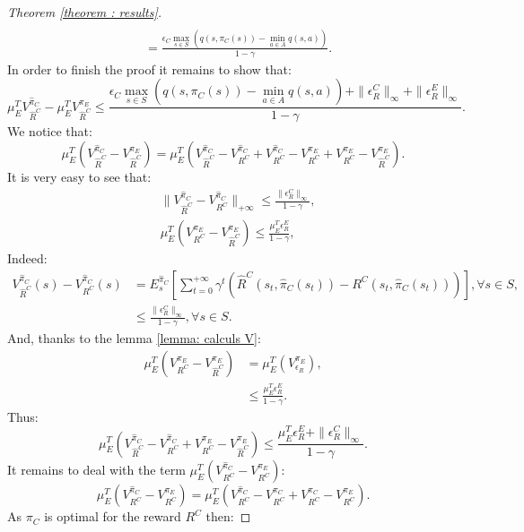 \documentclass{article} %
\newcommand{\0}{\mathbf{0}}
\newcommand{\1}{\mathbf{1}}
\begin{document}
\begin{proof}[Theorem \ref{theorem : results}]
\begin{align}
\\
&=\frac{\epsilon_C\max_{s\in S}(q(s,\pi_C(s))-\min_{a\in A}q(s,a))}{1-\gamma}.
\end{align}
In order to finish the proof it remains to show that:
\begin{equation}
\mu_E^TV^{\hat{\pi}_C}_{\hat{R}^C}-\mu_E^TV^{\pi_E}_{\hat{R}^C}\leq \frac{\epsilon_C\max_{s\in S}(q(s,\pi_C(s))-\min_{a\in A}q(s,a))+\|\epsilon^C_R\|_{\infty}+\|\epsilon^E_R\|_{\infty}}{1-\gamma}.
\end{equation}
We notice that:
\begin{equation}
\mu_E^T(V^{\hat{\pi}_C}_{\hat{R}^C}-V^{\pi_E}_{\hat{R}^C})=\mu_E^T(V^{\hat{\pi}_C}_{\hat{R}^C}-V^{\hat{\pi}_C}_{R^C}+V^{\hat{\pi}_C}_{R^C}-V^{\pi_E}_{R^C}+V^{\pi_E}_{R^C}-V^{\pi_E}_{\hat{R}^C}).
\end{equation}
It is very easy to see that:
\begin{align}
&\|V^{\hat{\pi}_C}_{\hat{R}^C}-V^{\hat{\pi}_C}_{R^C}\|_{+\infty}\leq\frac{\|\epsilon^C_R\|_{\infty}}{1-\gamma},
\\
&\mu_E^T(V^{\pi_E}_{R^C}-V^{\pi_E}_{\hat{R}^C})\leq\frac{\mu_E^T\epsilon^E_R}{1-\gamma},
\end{align}
Indeed:
\begin{align}
V^{\hat{\pi}_C}_{\hat{R}^C}(s)-V^{\hat{\pi}_C}_{R^C}(s)&=E^{\hat{\pi}_C}_s[\sum_{t=0}^{+\infty}\gamma^t(\hat{R}^C(s_t,\hat{\pi}_C(s_t))-R^C(s_t,\hat{\pi}_C(s_t)))], \forall s\in S,
\\
&\leq\frac{\|\epsilon^C_R\|_{\infty}}{1-\gamma}, \forall s\in S.
\end{align}
And, thanks to the lemma \ref{lemma: calculs V}:
\begin{align}
\mu_E^T(V^{\pi_E}_{R^C}-V^{\pi_E}_{\hat{R}^C})&=\mu_E^T(V^{\pi_E}_{\epsilon_R}),
\\
&\leq\frac{\mu_E^T\epsilon^E_R}{1-\gamma}.
\end{align}
Thus:
\begin{equation}
\label{equation: cas3-1}
\mu_E^T(V^{\hat{\pi}_C}_{\hat{R}^C}-V^{\hat{\pi}_C}_{R^C}+V^{\pi_E}_{R^C}-V^{\pi_E}_{\hat{R}^C})\leq\frac{\mu_E^T\epsilon^E_R+\|\epsilon^C_R\|_{\infty}}{1-\gamma}.
\end{equation}
It remains to deal with the term $\mu_E^T(V^{\hat{\pi}_C}_{R^C}-V^{\pi_E}_{R^C})$:
\begin{equation}
\mu_E^T(V^{\hat{\pi}_C}_{R^C}-V^{\pi_E}_{R^C})=\mu_E^T(V^{\hat{\pi}_C}_{R^C}-V^{\pi_C}_{R^C}+V^{\pi_C}_{R^C}-V^{\pi_E}_{R^C}).
\end{equation}
As $\pi_C$ is optimal for the reward $R^C$ then:

\end{proof}
\end{document}
